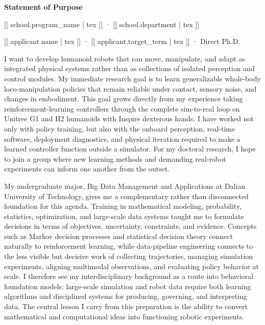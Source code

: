 \documentclass[11pt,letterpaper]{article}
\begin{document}
\color{Ink}
\begin{center}
  {\Large\bfseries Statement of Purpose\par}
  \vspace{0.35em}
  {\color{Accent}\small [[ school.program_name | tex ]] · [[ school.department | tex ]]\par}
  \vspace{0.2em}
  {\small [[ applicant.name | tex ]] · [[ applicant.target_term | tex ]] · Direct Ph.D.\par}
\end{center}
\vspace{0.4em}

I want to develop humanoid robots that can move, manipulate, and adapt as integrated physical
systems rather than as collections of isolated perception and control modules. My immediate
research goal is to learn generalizable whole-body loco-manipulation policies that remain
reliable under contact, sensory noise, and changes in embodiment. This goal grows directly from
my experience taking reinforcement-learning controllers through the complete sim-to-real loop on
Unitree G1 and H2 humanoids with Inspire dexterous hands. I have worked not only with policy
training, but also with the onboard perception, real-time software, deployment diagnostics, and
physical iteration required to make a learned controller function outside a simulator. For my
doctoral research, I hope to join a group where new learning methods and demanding real-robot
experiments can inform one another from the outset.

My undergraduate major, Big Data Management and Applications at Dalian University of Technology,
gives me a complementary rather than disconnected foundation for this agenda. Training in
mathematical modeling, probability, statistics, optimization, and large-scale data systems taught
me to formulate decisions in terms of objectives, uncertainty, constraints, and evidence. Concepts
such as Markov decision processes and statistical decision theory connect naturally to reinforcement
learning, while data-pipeline engineering connects to the less visible but decisive work of
collecting trajectories, managing simulation experiments, aligning multimodal observations, and
evaluating policy behavior at scale. I therefore see my interdisciplinary background as a route
into behavioral foundation models: large-scale simulation and robot data require both learning
algorithms and disciplined systems for producing, governing, and interpreting data. The central
lesson I carry from this preparation is the ability to convert mathematical and computational
ideas into functioning robotic experiments.
\end{document}
